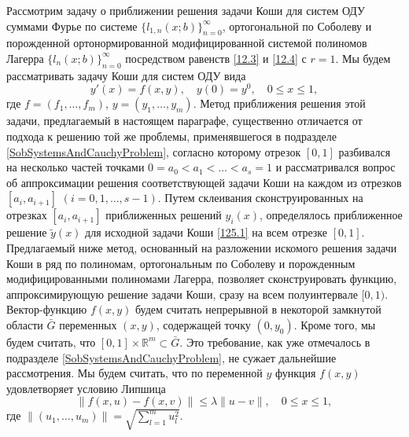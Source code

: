 Рассмотрим задачу о приближении решения задачи Коши для систем ОДУ  суммами  Фурье по системе $\{l_{1,n}(x;b)\}_{n=0}^\infty$, ортогональной по Соболеву и порожденной ортонормированной модифицированной системой полиномов Лагерра $\{l_{n}(x;b)\}_{n=0}^\infty$ посредством равенств \eqref{12.3} и \eqref{12.4} с $r=1$.
Мы будем рассматривать задачу Коши для систем ОДУ вида
\begin{equation}\label{125.1}
y'(x)=f(x,y), \quad y(0)=y^0,\quad 0\le x\le 1,
\end{equation}
где  $f=(f_1, \ldots, f_m)$, $y=(y_1, \ldots, y_m)$. Метод приближения решения этой задачи, предлагаемый в настоящем параграфе, существенно отличается от подхода к решению той же проблемы, применявшегося в подразделе \ref{SobSystemsAndCauchyProblem}, согласно которому  отрезок $[0,1]$ разбивался на несколько частей точками $0=a_0<a_1<\ldots<a_s=1$ и рассматривался вопрос об аппроксимации решения соответствующей задачи Коши на каждом из отрезков $[a_i,a_{i+1}]$ $(i=0,1,\ldots,s-1)$.  Путем склеивания сконструированных на отрезках $[a_i,a_{i+1}]$ приближенных решений $y_i(x)$, определялось приближенное решение $\tilde y(x)$ для исходной задачи Коши \eqref{125.1} на всем отрезке $[0,1]$.   Предлагаемый ниже метод, основанный на разложении искомого решения задачи Коши  в ряд по полиномам, ортогональным по Соболеву и порожденным  модифицированными полиномами Лагерра, позволяет сконструировать функцию, аппроксимирующую решение задачи Коши, сразу на всем полуинтервале $[0,1)$.  Вектор-функцию   $f(x,y)$  будем считать непрерывной в некоторой замкнутой  области $\bar G$ переменных $(x,y)$, содержащей точку $(0,y_0)$. Кроме того, мы будем  считать, что  $[0,1]\times\mathbb{R}^m\subset\bar G$. Это требование, как уже отмечалось в подразделе \ref{SobSystemsAndCauchyProblem}, не сужает дальнейшие рассмотрения.
Мы будем считать, что по переменной $y$ функция $f(x,y)$ удовлетворяет условию Липшица
\begin{equation}\label{125.2}
\|f(x,u)-f(x,v)\|\le \lambda\|u-v\|, \quad 0\le x \le 1,
\end{equation}
где $\|(u_1,\ldots,u_m)\|=\sqrt{\sum_{l=1}^mu_l^2}$.

